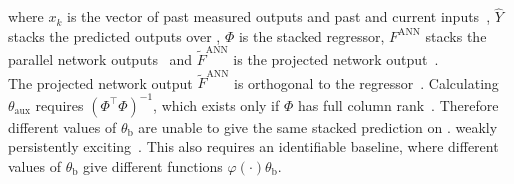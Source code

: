 where $x_k$ is the vector of past measured outputs and past and current
inputs~\cite[Eq.~(1)]{gyorok2026obc}, $\hat Y$ stacks the
predicted outputs over , $\Phi$ is the stacked
regressor, $F^{\mathrm{ANN}}$ stacks the parallel network
outputs~\cite[Eq.~(5)]{gyorok2026obc} and $\tilde F^{\mathrm{ANN}}$ is the
projected network output~\cite[Eqs.~(9), (10)]{gyorok2026obc}.
\\
The projected network output $\tilde F^{\mathrm{ANN}}$ is
orthogonal to the regressor~\cite[Lemma~3]{gyorok2026obc}.
Calculating $\theta_{\mathrm{aux}}$ requires
$(\Phi^\top\Phi)^{-1}$, which exists only if $\Phi$ has
full column rank~\cite[Assumption~1]{gyorok2026obc}.
Therefore different values of $\theta_{\mathrm b}$ are unable 
to give the same stacked prediction on .
 weakly persistently
exciting~\cite[Eq.~(6), Sec.~4.3]{gyorok2026obc}.
This also requires an identifiable baseline, where different
values of $\theta_{\mathrm b}$ give different functions
$\varphi(\cdot)\theta_{\mathrm b}$.

